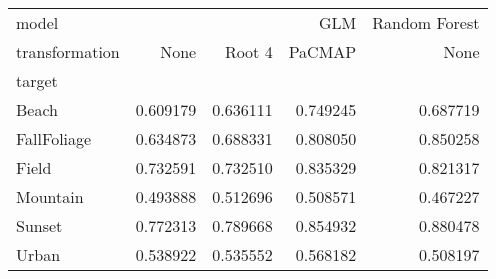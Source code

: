 \begin{tabular}{lrrrr}
\toprule
model & \multicolumn{3}{r}{GLM} & Random Forest \\
transformation & None & Root 4 & PaCMAP & None \\
target &  &  &  &  \\
\midrule
Beach & 0.609179 & 0.636111 & 0.749245 & 0.687719 \\
FallFoliage & 0.634873 & 0.688331 & 0.808050 & 0.850258 \\
Field & 0.732591 & 0.732510 & 0.835329 & 0.821317 \\
Mountain & 0.493888 & 0.512696 & 0.508571 & 0.467227 \\
Sunset & 0.772313 & 0.789668 & 0.854932 & 0.880478 \\
Urban & 0.538922 & 0.535552 & 0.568182 & 0.508197 \\
\bottomrule
\end{tabular}
